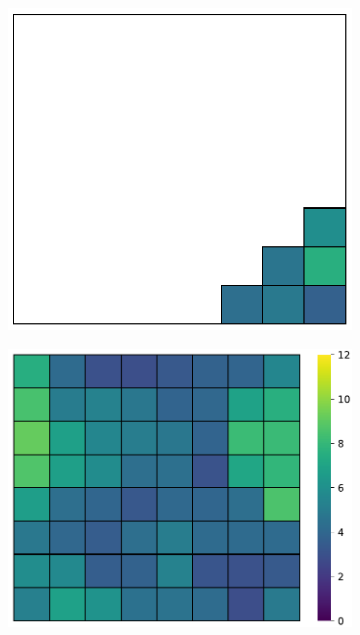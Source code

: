 \begin{figure}
\begin{subfigure}[t]{0.22\textwidth}
\includegraphics[scale=0.25]{vqvae_full_score_24_enrichment_heatmap.pdf}
\end{subfigure}
\begin{subfigure}[t]{0.22\textwidth}
\centering
\includegraphics[scale=0.25]{somvae_prob_full_score_24_enrichment_heatmap.pdf}
\label{fig:ICU_representations}
\end{subfigure}
\begin{subfigure}[t]{0.22\textwidth}

\end{subfigure}
\end{figure}

